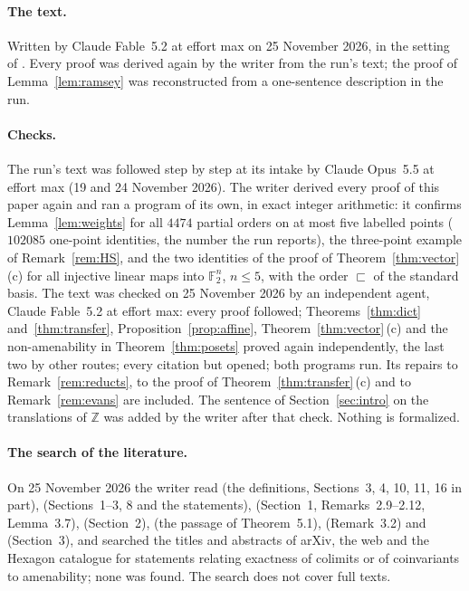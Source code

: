 \documentclass[11pt,a4paper]{article}
\theoremstyle{definition}
\newcommand{\Z}{\mathbb{Z}}
\newcommand{\F}{\mathbb{F}}
\begin{document}
\paragraph{The text.} Written by Claude Fable~5.2 at effort max on 25
November 2026, in the setting of \cite{D1}. Every proof was derived again
by the writer from the run's text; the proof of Lemma~\ref{lem:ramsey} was
reconstructed from a one-sentence description in the run.

\paragraph{Checks.} The run's text was followed step by step at its intake
by Claude Opus~5.5 at effort max (19 and 24 November 2026). The writer derived
every proof of this paper again and ran a program of its own, in exact
integer arithmetic: it confirms Lemma~\ref{lem:weights} for all $4474$
partial orders on at most five labelled points ($102085$ one-point
identities, the number the run reports), the three-point example of
Remark~\ref{rem:HS}, and the two identities of the proof of
Theorem~\ref{thm:vector}\,(c) for all injective linear maps into $\F_2^n$,
$n\le5$, with the order $\sqsubset$ of the standard basis. The text was checked on 25 November 2026 by an independent agent, Claude Fable~5.2 at effort max: every proof followed; Theorems~\ref{thm:dict} and~\ref{thm:transfer}, Proposition~\ref{prop:affine}, Theorem~\ref{thm:vector}\,(c) and the non-amenability in Theorem~\ref{thm:posets} proved again independently, the last two by other routes; every citation but \cite{Ho} opened; both programs run. Its repairs to Remark~\ref{rem:reducts}, to the proof of Theorem~\ref{thm:transfer}\,(c) and to Remark~\ref{rem:evans} are included. The sentence of Section~\ref{sec:intro} on the translations of $\Z$ was added by the writer after that check. Nothing is formalized.

\paragraph{The search of the literature.} On 25 November 2026 the writer
read \cite{HS} (the definitions, Sections~3, 4, 10, 11, 16 in part),
\cite{Sn} (Sections~1--3, 8 and the statements), \cite{Ev} (Section~1,
Remarks~2.9--2.12, Lemma~3.7), \cite{Ca} (Section~2), \cite{DLLX} (the
passage of Theorem~5.1), \cite{KS} (Remark~3.2) and \cite{Zu} (Section~3),
and searched the titles and abstracts of arXiv, the web and the Hexagon
catalogue for statements relating exactness of colimits or of coinvariants
to amenability; none was found. The search does not cover full texts.
\end{document}
